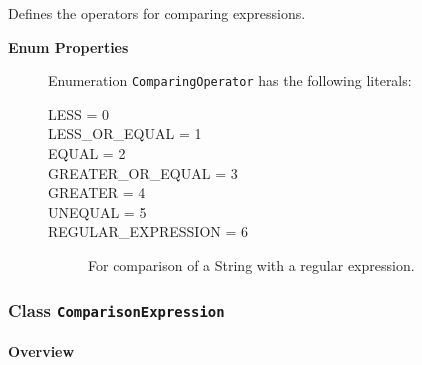 			
Defines the operators for comparing expressions.	
		
	


\begin{description}

	\item[\textbf{Enum Properties}] Enumeration \texttt{ComparingOperator} has the following literals:

	\begin{description}
		
		\item[LESS = 0]
		\hspace{\fill}
		\nopagebreak

		\item[LESS\_OR\_EQUAL = 1]
		\hspace{\fill}
		\nopagebreak

		\item[EQUAL = 2]
		\hspace{\fill}
		\nopagebreak

		\item[GREATER\_OR\_EQUAL = 3]
		\hspace{\fill}
		\nopagebreak

		\item[GREATER = 4]
		\hspace{\fill}
		\nopagebreak

		\item[UNEQUAL = 5]
		\hspace{\fill}
		\nopagebreak

		\item[REGULAR\_EXPRESSION = 6]
		\hspace{\fill}
		\nopagebreak
		
For comparison of a String with a regular expression.	
 
	\end{description}

\end{description}



\subsubsection{\Large{Class \bfseries \texttt{ComparisonExpression}\normalfont}}
\label{cls:modeling::expressions::ComparisonExpression} 
\paragraph{Overview}

